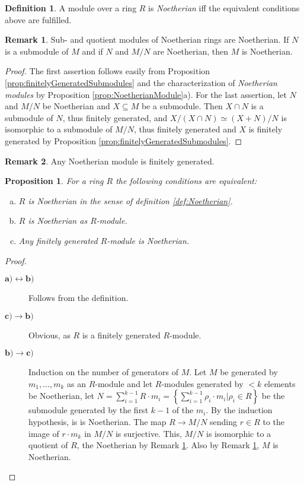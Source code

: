 \documentclass[DIV=14,parskip=half]{scrartcl}
\newtheorem{prop}{Proposition}[subsection]
\theoremstyle{definition}
\newtheorem{defi}{Definition}[subsection]
\newtheorem{rem}{Remark}[subsection]
\newcommand{\longto}{\longrightarrow}
\begin{document}
\begin{defi}\label{def:NoetherianModule}
 A module over a ring $R$ is \emph{Noetherian} iff the equivalent conditions above are fulfilled.
\end{defi}
\begin{rem}\label{rem:subQuotientNoetherian}
 Sub- and quotient modules of Noetherian rings are Noetherian. If $N$ is a submodule of $M$ and if $N$ and $M/N$ are Noetherian, then $M$ is Noetherian.
\end{rem}
\begin{proof}
 The first assertion follows easily from Proposition \ref{prop:finitelyGeneratedSubmodules} and the characterization of \emph{Noetherian modules} by Proposition \ref{prop:NoetherianModule}a). For the last assertion, let $N$ and $M/N$ be Noetherian and $X\subseteq M$ be a submodule. Then $X\cap N$ is a submodule of $N$, thus finitely generated, and $X/(X\cap N) \simeq (X+N)/N$ is isomorphic to a submodule of $M/N$, thus finitely generated and $X$ is finitely generated by Proposition \ref{prop:finitelyGeneratedSubmodules}. 
\end{proof}
\begin{rem}
 Any Noetherian module is finitely generated.
\end{rem}
\begin{prop}\label{prop:ringNoetherianModule}
 For a ring $R$ the following conditions are equivalent:
 \begin{enumerate}[a)]
  \item $R$ is Noetherian in the sense of definition \ref{def:Noetherian}.
  \item $R$ is Noetherian as $R$-module.
  \item Any finitely generated $R$-module is Noetherian.
 \end{enumerate}

\end{prop}
\begin{proof}
 \begin{description}
  \item [$\mathbf{a)\leftrightarrow b)}$] Follows from the definition.
  \item [$\mathbf{c)\to b)}$] Obvious, as $R$ is a finitely generated $R$-module.
  \item [$\mathbf{b)\to c)}$] Induction on the number of generators of $M$. Let $M$ be generated by $m_1,\ldots,m_k$ as an $R$-module and let $R$-modules generated by $<k$ elements be Noetherian, let $N= \sum_{i=1}^{k-1} R\cdot m_i = \left\{\sum_{i=1}^{k-1} \rho_i\cdot m_i |\rho_i \in R\right\}$ be the submodule generated by the first $k-1$ of the $m_i$. By the induction hypothesis, is is Noetherian. The map $R\longto M/N$ sending $r\in R$ to the image of $r\cdot m_k$ in $M/N$ is surjective. This, $M/N$ is isomorphic to a quotient of $R$, the Noetherian by Remark \ref{rem:subQuotientNoetherian}. Also by Remark \ref{rem:subQuotientNoetherian}, $M$ is Noetherian.
 \end{description}

\end{proof}
\end{document}
